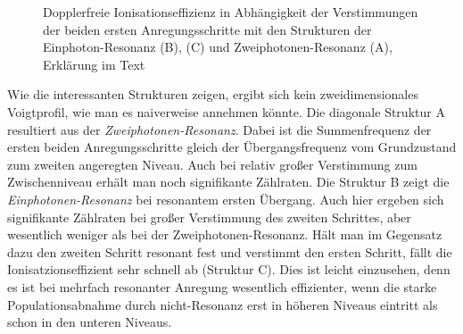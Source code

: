 \begin{figure}[h]
	\centering
	\caption[2D-Laserscan]{Dopplerfreie
	Ionisationseffizienz in Abhängigkeit
	der Verstimmungen der beiden ersten
	Anregungsschritte mit den Strukturen
	der Einphoton-Resonanz (B), (C) und
	Zweiphotonen-Resonanz (A),
	Erklärung im Text}\label{fig:2D-laserscan_theorie_schumann}
\end{figure}
Wie die interessanten Strukturen zeigen, ergibt sich kein zweidimensionales
Voigtprofil, wie man es naiverweise annehmen könnte. Die diagonale Struktur A
resultiert aus der \textit{Zweiphotonen-Resonanz}. Dabei ist die Summenfrequenz
der ersten beiden Anregungsschritte gleich der Übergangsfrequenz vom
Grundzustand zum zweiten angeregten Niveau. Auch bei relativ großer Verstimmung
zum Zwischenniveau erhält man noch signifikante Zählraten. Die Struktur B
zeigt die \textit{Einphotonen-Resonanz} bei resonantem ersten Übergang. Auch
hier ergeben sich signifikante Zählraten bei großer Verstimmung des zweiten Schrittes, aber
wesentlich weniger als bei der Zweiphotonen-Resonanz. Hält man im Gegensatz dazu
den zweiten Schritt resonant fest und verstimmt den ersten Schritt, fällt die
Ionisatzionseffizient sehr schnell ab (Struktur C). Dies ist leicht einzusehen,
denn es ist bei mehrfach resonanter Anregung wesentlich effizienter, wenn die starke
Populationsabnahme durch nicht-Resonanz erst in höheren Niveaus eintritt als
schon in den unteren Niveaus.

